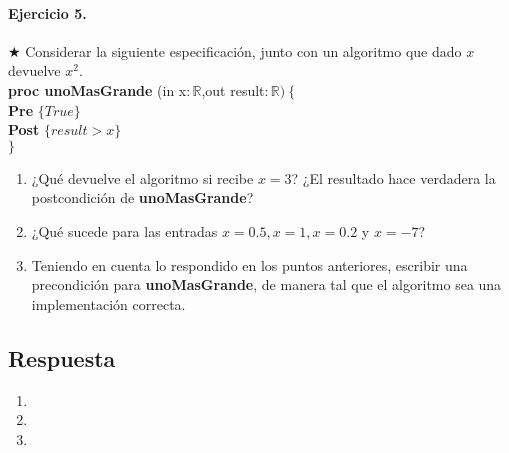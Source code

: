 \documentclass[a4paper]{article}
\begin{document}
\paragraph*{Ejercicio 5.}$\bigstar$ Considerar la siguiente especificación, junto con un algoritmo que dado $x$ devuelve $x^2$.\medskip \\
		\textbf{proc unoMasGrande }(in x$: \mathbb{R}$,out result$:\mathbb{R})\ \{$\smallskip \\
		\hspace*{6mm} \textbf{Pre }$\{ True\}$\smallskip \\
		\hspace*{6mm} \textbf{Post }$\{result>x\}$\\
		$\}$
	\begin{enumerate}[label=\alph*)]
		\item ¿Qué devuelve el algoritmo si recibe $x=3$? ¿El resultado hace verdadera la postcondición de \textbf{unoMasGrande}?
		\item ¿Qué sucede para las entradas $x=0.5,x=1,x=0.2$ y $x=-7$?
		\item Teniendo en cuenta lo respondido en los puntos anteriores, escribir una precondición para \textbf{unoMasGrande}, de manera tal que el algoritmo sea una implementación correcta.
	\end{enumerate}
\subsection*{Respuesta}
	\begin{enumerate}[label=\alph*)]
		\item
		\item
		\item
	\end{enumerate}
	
\end{document}
